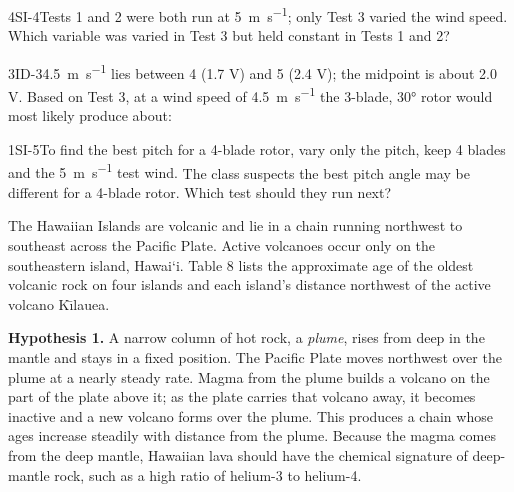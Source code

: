 \documentclass[11pt]{article}
\begin{document}
\begin{q}{4}{SI-4}{Tests 1 and 2 were both run at \SI{5}{\metre\per\second}; only Test 3 varied the wind speed.}
Which variable was varied in Test 3 but held constant in Tests 1 and 2?
\end{q}

\begin{q}{3}{ID-3}{\SI{4.5}{\metre\per\second} lies between 4 (1.7 V) and 5 (2.4 V); the midpoint is about 2.0 V.}
Based on Test 3, at a wind speed of \SI{4.5}{\metre\per\second} the 3-blade, \ang{30} rotor would most likely produce about:
\end{q}

\begin{q}{1}{SI-5}{To find the best pitch for a 4-blade rotor, vary only the pitch, keep 4 blades and the \SI{5}{\metre\per\second} test wind.}
The class suspects the best pitch angle may be different for a 4-blade rotor. Which test should they run next?
\end{q}

The Hawaiian Islands are volcanic and lie in a chain running northwest to southeast across the Pacific Plate. Active volcanoes occur only on the southeastern island, Hawai`i. Table 8 lists the approximate age of the oldest volcanic rock on four islands and each island's distance northwest of the active volcano K\={\i}lauea.


\textbf{Hypothesis 1.} A narrow column of hot rock, a \emph{plume}, rises from deep in the mantle and stays in a fixed position. The Pacific Plate moves northwest over the plume at a nearly steady rate. Magma from the plume builds a volcano on the part of the plate above it; as the plate carries that volcano away, it becomes inactive and a new volcano forms over the plume. This produces a chain whose ages increase steadily with distance from the plume. Because the magma comes from the deep mantle, Hawaiian lava should have the chemical signature of deep-mantle rock, such as a high ratio of helium-3 to helium-4.
\end{document}
